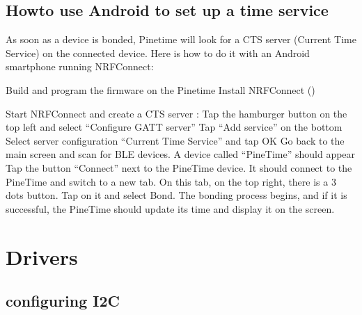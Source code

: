 \documentclass[letterpaper,10pt,english]{sphinxmanual}
\begin{document}
\section{Howto use Android to set up a time service}
\label{\detokenize{current-time:howto-use-android-to-set-up-a-time-service}}
As soon as a device is bonded, Pinetime will look for a CTS server (Current Time Service) on the connected device.
Here is how to do it with an Android smartphone running NRFConnect:

Build and program the firmware on the Pinetime Install NRFConnect ()

Start NRFConnect and create a CTS server : Tap the hamburger button on the top left and select “Configure GATT server” Tap “Add service” on the bottom Select server configuration “Current Time Service” and tap OK Go back to the main screen and scan for BLE devices. A device called “PineTime” should appear Tap the button “Connect” next to the PineTime device. It should connect to the PineTime and switch to a new tab. On this tab, on the top right, there is a 3 dots button. Tap on it and select Bond. The bonding process begins, and if it is successful, the PineTime should update its time and display it on the screen.


\chapter{Drivers}
\label{\detokenize{drivers/drivers:drivers}}\label{\detokenize{drivers/drivers:id1}}\label{\detokenize{drivers/drivers::doc}}

\section{configuring I2C}
\label{\detokenize{drivers/i2c:configuring-i2c}}\label{\detokenize{drivers/i2c::doc}}
\end{document}
